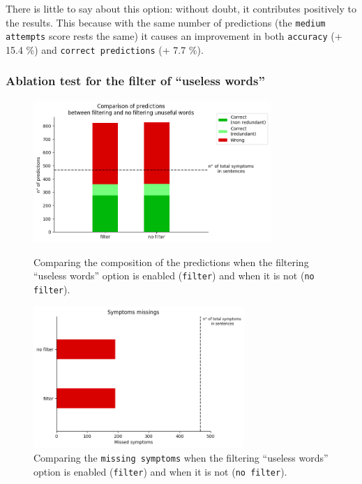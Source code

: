 
There is little to say about this option: without doubt, it contributes positively to the results. This because with the same number of predictions (the \texttt{medium attempts} score rests the same) it causes an improvement in both \texttt{accuracy} (+ 15.4 \%) and \texttt{correct predictions} (+ 7.7 \%).


\newpage
\subsubsection{Ablation test for the filter of ``useless words''}
\begin{figure}[h]%
  \centering
  \begin{minipage}[b]{0.4\textwidth}
    \includegraphics[width=9cm]{graphs/comparison_filtering}
    \caption{Comparing the composition of the predictions when the filtering ``useless words'' option is enabled (\texttt{filter}) and when it is not (\texttt{no filter}).}
  \end{minipage}
  \hfill
  \begin{minipage}[b]{0.4\textwidth}
    \includegraphics[width=8cm]{graphs/comparison_filtering_missings}
    \caption{Comparing the \texttt{missing symptoms} when the filtering ``useless words'' option is enabled (\texttt{filter}) and when it is not (\texttt{no filter}).}
  \end{minipage}
\end{figure}


